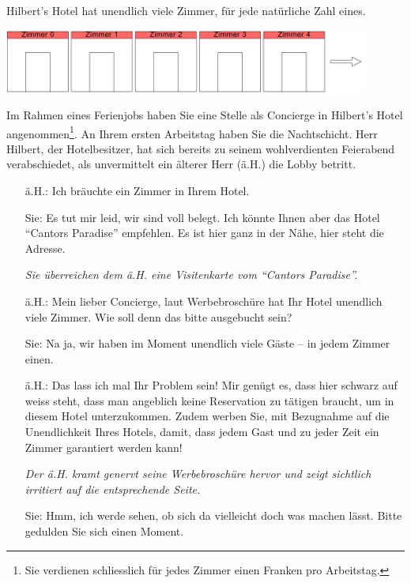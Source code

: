 \begin{bsp}
Hilbert's Hotel hat unendlich viele Zimmer, für jede natürliche Zahl eines.
\begin{center}
\begin{framed}
\includegraphics[width=0.9\textwidth]{figures/hilbertHotel}
\end{framed}
\end{center}
Im Rahmen eines Ferienjobs haben Sie eine Stelle als Concierge in Hilbert's Hotel angenommen\footnote{Sie verdienen schliesslich für jedes Zimmer einen Franken pro Arbeitstag.}. An Ihrem ersten Arbeitstag haben Sie die Nachtschicht. Herr Hilbert, der Hotelbesitzer, hat sich bereits zu seinem wohlverdienten Feierabend verabschiedet, als unvermittelt ein älterer Herr (ä.H.) die Lobby betritt.
\begin{itemize}
\item[ä.H.:] Ich bräuchte ein Zimmer in Ihrem Hotel.
\item[Sie:] Es tut mir leid, wir sind voll belegt. Ich könnte Ihnen aber das Hotel ``Cantors Paradise'' empfehlen. Es ist hier ganz in der Nähe, hier steht die Adresse.

\textit{Sie überreichen dem ä.H. eine Visitenkarte vom ``Cantors Paradise''.}
\item[ä.H.:] Mein lieber Concierge, laut Werbebroschüre hat Ihr Hotel unendlich viele Zimmer. Wie soll denn das bitte ausgebucht sein?
\item[Sie:] Na ja, wir haben im Moment unendlich viele Gäste -- in jedem Zimmer einen.
\item[ä.H.:] Das lass ich mal Ihr Problem sein! Mir genügt es, dass hier schwarz auf weiss steht, dass man angeblich keine Reservation zu tätigen braucht, um in diesem Hotel unterzukommen. Zudem werben Sie, mit Bezugnahme auf die Unendlichkeit Ihres Hotels, damit, dass jedem Gast und zu jeder Zeit ein Zimmer garantiert werden kann!

\textit{Der ä.H. kramt genervt seine Werbebroschüre hervor und zeigt sichtlich irritiert auf die entsprechende Seite.}
\item[Sie:] Hmm, ich werde sehen, ob sich da vielleicht doch was machen lässt. Bitte gedulden Sie sich einen Moment.


\end{itemize}
\end{bsp}

